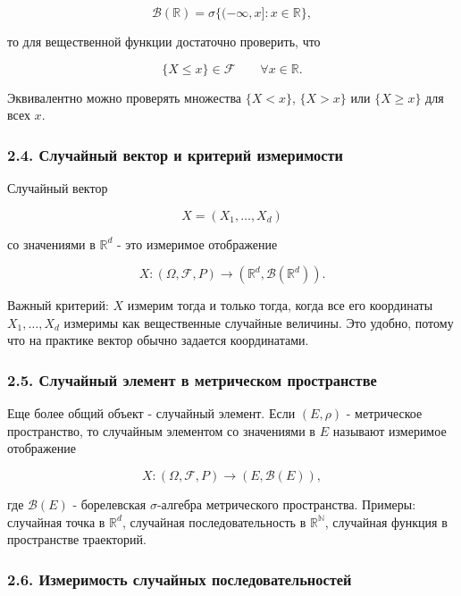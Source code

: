 \documentclass[
  11pt,
  a4paper,
]{article}
\begin{document}
\[
\mathcal B(\mathbb R)=\sigma\{(-\infty,x]:x\in\mathbb R\},
\]

то для вещественной функции достаточно проверить, что

\[
\{X\le x\}\in\mathcal F\qquad \forall x\in\mathbb R.
\]

Эквивалентно можно проверять множества \(\{X<x\}\), \(\{X>x\}\) или
\(\{X\ge x\}\) для всех \(x\).

\subsubsection{2.4. Случайный вектор и критерий
измеримости}\label{ux441ux43bux443ux447ux430ux439ux43dux44bux439-ux432ux435ux43aux442ux43eux440-ux438-ux43aux440ux438ux442ux435ux440ux438ux439-ux438ux437ux43cux435ux440ux438ux43cux43eux441ux442ux438}

Случайный вектор

\[
X=(X_1,\ldots,X_d)
\]

со значениями в \(\mathbb R^d\) - это измеримое отображение

\[
X:(\Omega,\mathcal F,P)\to(\mathbb R^d,\mathcal B(\mathbb R^d)).
\]

Важный критерий: \(X\) измерим тогда и только тогда, когда все его
координаты \(X_1,\ldots,X_d\) измеримы как вещественные случайные
величины. Это удобно, потому что на практике вектор обычно задается
координатами.

\subsubsection{2.5. Случайный элемент в метрическом
пространстве}\label{ux441ux43bux443ux447ux430ux439ux43dux44bux439-ux44dux43bux435ux43cux435ux43dux442-ux432-ux43cux435ux442ux440ux438ux447ux435ux441ux43aux43eux43c-ux43fux440ux43eux441ux442ux440ux430ux43dux441ux442ux432ux435}

Еще более общий объект - случайный элемент. Если \((E,\rho)\) -
метрическое пространство, то случайным элементом со значениями в \(E\)
называют измеримое отображение

\[
X:(\Omega,\mathcal F,P)\to(E,\mathcal B(E)),
\]

где \(\mathcal B(E)\) - борелевская \(\sigma\)-алгебра метрического
пространства. Примеры: случайная точка в \(\mathbb R^d\), случайная
последовательность в \(\mathbb R^{\mathbb N}\), случайная функция в
пространстве траекторий.

\subsubsection{2.6. Измеримость случайных
последовательностей}\label{ux438ux437ux43cux435ux440ux438ux43cux43eux441ux442ux44c-ux441ux43bux443ux447ux430ux439ux43dux44bux445-ux43fux43eux441ux43bux435ux434ux43eux432ux430ux442ux435ux43bux44cux43dux43eux441ux442ux435ux439}
\end{document}
